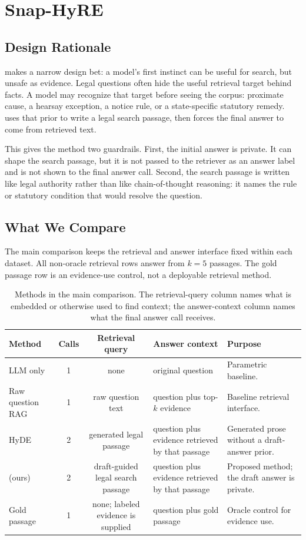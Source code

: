 \section{Snap-HyRE}\label{sec:method}

\subsection{Design Rationale}

\hyre{} makes a narrow design bet: a model's first instinct can be useful for
search, but unsafe as evidence. Legal questions often hide the useful retrieval
target behind facts. A model may recognize that target before seeing the corpus:
proximate cause, a hearsay exception, a notice rule, or a state-specific
statutory remedy. \hyre{} uses that prior to write a legal search passage, then
forces the final answer to come from retrieved text.

This gives the method two guardrails. First, the initial answer is private. It
can shape the search passage, but it is not passed to the retriever as an
answer label and is not shown to the final answer call. Second, the search
passage is written like legal authority rather than like chain-of-thought
reasoning: it names the rule or statutory condition that would resolve the
question.

\subsection{What We Compare}

The main comparison keeps the retrieval and answer interface fixed within each
dataset. All non-oracle retrieval rows answer from $k=5$ passages. The gold
passage row is an evidence-use control, not a deployable retrieval method.

\begin{table}[t]
\centering
\caption{Methods in the main comparison. The retrieval-query column names what
is embedded or otherwise used to find context; the answer-context column names
what the final answer call receives.}
\label{tab:method_ladder}
\footnotesize
\begin{tabularx}{\textwidth}{lccYY}
\toprule
Method & Calls & Retrieval query & Answer context & Purpose \\
\midrule
LLM only & 1 & none & original question & Parametric baseline. \\
Raw question RAG & 1 & raw question text & question plus top-$k$ evidence & Baseline retrieval interface. \\
HyDE & 2 & generated legal passage & question plus evidence retrieved by that passage & Generated prose without a draft-answer prior. \\
\hyre{} (ours) & 2 & draft-guided legal search passage & question plus evidence retrieved by that passage & Proposed method; the draft answer is private. \\
Gold passage & 1 & none; labeled evidence is supplied & question plus gold passage & Oracle control for evidence use. \\
\bottomrule
\end{tabularx}
\end{table}

